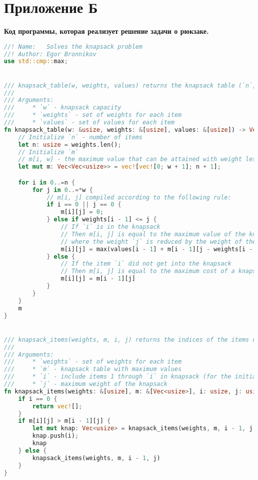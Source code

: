 \section*{Приложение Б}

\begin{center}
    \textbf{Код программы, которая реализует решение задачи о рюкзаке.}
\end{center}

\begin{lstlisting}[language=Rust]
//! Name:   Solves the knapsack problem
//! Author: Egor Bronnikov
use std::cmp::max;


/// knapsack_table(w, weights, values) returns the knapsack table (`n`, `m`) with maximum values, where `n` is number of items
///
/// Arguments:
///     * `w` - knapsack capacity
///     * `weights` - set of weights for each item
///     * `values` - set of values for each item
fn knapsack_table(w: &usize, weights: &[usize], values: &[usize]) -> Vec<Vec<usize>> {
    // Initialize `n` - number of items
    let n: usize = weights.len();
    // Initialize `m`
    // m[i, w] - the maximum value that can be attained with weight less that or equal to `w` using items up to `i`
    let mut m: Vec<Vec<usize>> = vec![vec![0; w + 1]; n + 1];

    for i in 0..=n {
        for j in 0..=*w {
            // m[i, j] compiled according to the following rule:
            if i == 0 || j == 0 {
                m[i][j] = 0;
            } else if weights[i - 1] <= j {
                // If `i` is in the knapsack
                // Then m[i, j] is equal to the maximum value of the knapsack,
                // where the weight `j` is reduced by the weight of the `i-th` item and the set of admissible items plus the value `k`
                m[i][j] = max(values[i - 1] + m[i - 1][j - weights[i - 1]], m[i - 1][j]);
            } else {
                // If the item `i` did not get into the knapsack
                // Then m[i, j] is equal to the maximum cost of a knapsack with the same capacity and a set of admissible items
                m[i][j] = m[i - 1][j]
            }
        }
    }
    m
}


/// knapsack_items(weights, m, i, j) returns the indices of the items of the optimal knapsack (from 1 to `n`)
///
/// Arguments:
///     * `weights` - set of weights for each item
///     * `m` - knapsack table with maximum values
///     * `i` - include items 1 through `i` in knapsack (for the initial value, use `n`)
///     * `j` - maximum weight of the knapsack
fn knapsack_items(weights: &[usize], m: &[Vec<usize>], i: usize, j: usize) -> Vec<usize> {
    if i == 0 {
        return vec![];
    }
    if m[i][j] > m[i - 1][j] {
        let mut knap: Vec<usize> = knapsack_items(weights, m, i - 1, j - weights[i - 1]);
        knap.push(i);
        knap
    } else {
        knapsack_items(weights, m, i - 1, j)
    }
}



\end{lstlisting}
